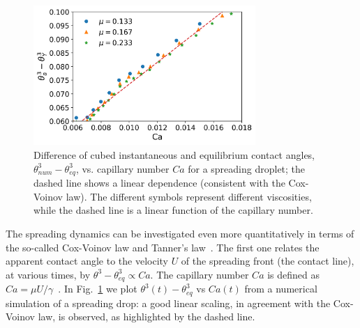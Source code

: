 \begin{figure}
    \centering 
    \includegraphics[width=0.75\textwidth]{graphics/Fig_5_Indirect_Cox_Voinov_all_data_visually_appealing_slip_2_m_nosci.png}
    \caption{Difference of cubed instantaneous and equilibrium contact angles, $\theta_{num}^3-\theta_{eq}^3$, vs. capillary number $Ca$ for a spreading droplet; the dashed line shows a linear dependence (consistent with the Cox-Voinov law). The different symbols represent different viscosities, while the dashed line is a linear function of the capillary number.
    \label{fig:Cox-Voinov}}
\end{figure}
The spreading dynamics can be investigated even more quantitatively in terms of the so-called Cox-Voinov law and Tanner's law~\cite{tannerSpreadingSiliconeOil1979}. 
The first one relates the apparent contact angle to the velocity $U$ of the spreading front (the contact line), at various times, by $\theta^3 - \theta_{eq}^3 \propto Ca$. 
The capillary number $Ca$ is defined as $Ca=\mu U/\gamma$~\cite{snoeijerMovingContactLines2013}.
In Fig.~\ref{fig:Cox-Voinov} we plot $\theta^3(t) - \theta_{eq}^3$ vs $Ca(t)$ from a numerical simulation of a spreading drop: a good linear scaling, in agreement with the Cox-Voinov law, is observed, as highlighted by the dashed line. 

